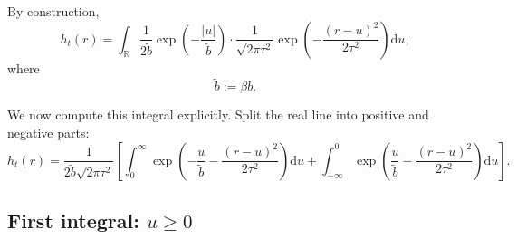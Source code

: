 \documentclass[11pt]{article}
\newcommand{\R}{\mathbb{R}}
\newcommand{\dd}{\mathrm{d}}
\newcommand{\1}{\mathbf{1}}
\theoremstyle{definition}
\begin{document}
By construction,
\begin{equation}
\label{eq:ht-convolution}
h_t(r)=\int_{\R}\frac{1}{2\tilde b}\exp\!\left(-\frac{|u|}{\tilde b}\right)
\cdot
\frac{1}{\sqrt{2\pi\tau^2}}\exp\!\left(-\frac{(r-u)^2}{2\tau^2}\right)\dd u,
\end{equation}
where
\begin{equation}
\tilde b := \beta b.
\end{equation}

We now compute this integral explicitly. Split the real line into positive and negative parts:
\begin{equation}
\label{eq:ht-split}
h_t(r)=\frac{1}{2\tilde b\sqrt{2\pi\tau^2}}
\left[
\int_0^{\infty} \exp\!\left(-\frac{u}{\tilde b}-\frac{(r-u)^2}{2\tau^2}\right)\dd u
+
\int_{-\infty}^{0} \exp\!\left(\frac{u}{\tilde b}-\frac{(r-u)^2}{2\tau^2}\right)\dd u
\right].
\end{equation}

\subsection{First integral: \(u\ge 0\)}
\end{document}
